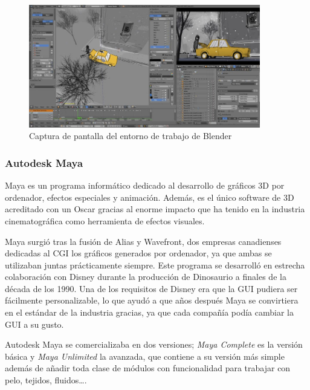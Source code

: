 \begin{figure}[!h]
\begin{center}
\includegraphics[width=0.9\textwidth]{imagenes/2/blender.jpg}
\caption{Captura de pantalla del entorno de trabajo de Blender}
\label{fig:blender}
\end{center}
\end{figure}

\subsubsection{Autodesk Maya}

Maya es un programa informático dedicado al desarrollo de gráficos 3D por ordenador, efectos especiales y animación. Además, es el único software de 3D acreditado con un Oscar gracias al enorme impacto que ha tenido en la industria cinematográfica como herramienta de efectos visuales.

Maya surgió tras la fusión de Alias y Wavefront, dos empresas canadienses dedicadas al \acs{CGI} los gráficos generados por ordenador, ya que ambas se utilizaban juntas prácticamente siempre. Este programa se desarrolló en estrecha colaboración con Disney durante la producción de Dinosaurio a finales de la década de los 1990. Una de los requisitos de Disney era que la \acs{GUI} pudiera ser fácilmente personalizable, lo que ayudó a que años después Maya se convirtiera en el estándar de la industria gracias, ya que cada compañía podía cambiar la \acs{GUI} a su gusto.

Autodesk Maya se comercializaba en dos versiones; \textit{Maya Complete} es la versión básica y \textit{Maya Unlimited} la avanzada, que contiene a su versión más simple además de añadir toda clase de módulos con funcionalidad para trabajar con pelo, tejidos, fluidos\dots{}.

